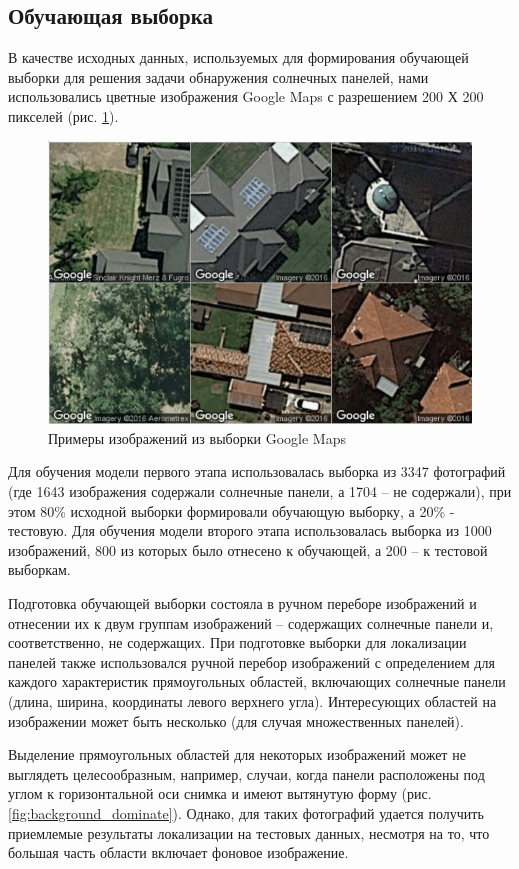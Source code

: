 \subsection{Обучающая выборка}
В качестве исходных данных, используемых для формирования обучающей выборки для решения задачи обнаружения солнечных панелей, нами использовались цветные изображения Google Maps с разрешением 200 Х 200 пикселей (рис. \ref{fig:google_maps}).

\begin{figure}[ht]
	\centering
	\includegraphics[width=12cm]{man-source/images/ch4/pic4-17.png}
	\caption{Примеры изображений из выборки Google Maps}
	\label{fig:google_maps}
\end{figure}

Для обучения модели первого этапа использовалась выборка из 3347 фотографий (где 1643 изображения содержали солнечные панели, а 1704 -- не содержали), при этом 80\% исходной выборки формировали обучающую выборку, а 20\% - тестовую. Для обучения модели второго этапа использовалась выборка из 1000 изображений, 800 из которых было отнесено к обучающей, а 200 -- к тестовой выборкам.

Подготовка обучающей выборки состояла в ручном переборе изображений и отнесении их к двум группам изображений -- содержащих солнечные панели и, соответственно, не содержащих. При подготовке выборки для локализации панелей также использовался ручной перебор изображений с определением для каждого характеристик прямоугольных областей, включающих солнечные панели (длина, ширина, координаты левого верхнего угла). Интересующих областей на изображении может быть несколько (для случая множественных панелей). 

Выделение прямоугольных областей для некоторых изображений может не выглядеть целесообразным, например, случаи, когда панели расположены под углом к горизонтальной оси снимка и имеют вытянутую форму (рис. \ref{fig:background_dominate}). Однако, для таких фотографий удается получить приемлемые результаты локализации на тестовых данных, несмотря на то, что большая часть области включает фоновое изображение.
 
